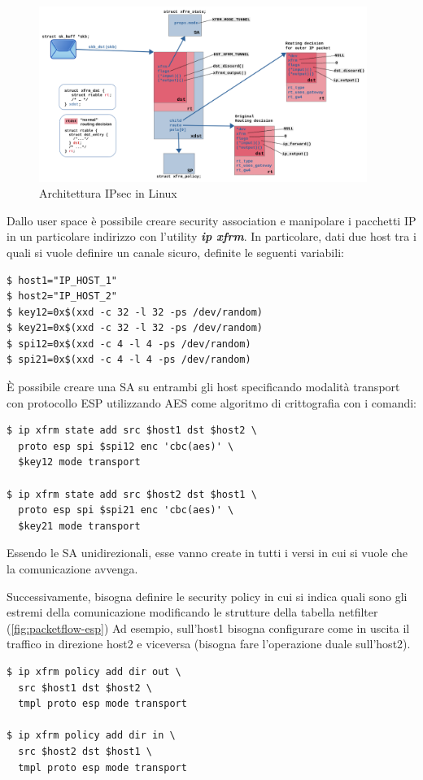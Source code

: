 \documentclass{article}
\begin{document}
\begin{figure}
  \begin{center}
    \includegraphics[width=0.95\textwidth]{figures/ipsec-linux.png}
  \end{center}
  \caption{Architettura IPsec in Linux}\label{fig:ipsec-linux}
\end{figure}


Dallo user space 
è possibile creare security association e manipolare i pacchetti IP in un particolare 
indirizzo con l'utility \textbf{\textit{ip xfrm}}. In particolare, dati due host 
tra i quali si vuole definire un canale sicuro, definite le 
seguenti variabili:

\begin{verbatim}
$ host1="IP_HOST_1"
$ host2="IP_HOST_2"
$ key12=0x$(xxd -c 32 -l 32 -ps /dev/random)
$ key21=0x$(xxd -c 32 -l 32 -ps /dev/random)
$ spi12=0x$(xxd -c 4 -l 4 -ps /dev/random)
$ spi21=0x$(xxd -c 4 -l 4 -ps /dev/random)
\end{verbatim}

È possibile creare una SA su entrambi gli host specificando modalità transport con protocollo 
ESP utilizzando AES come algoritmo di crittografia con i comandi:

\begin{verbatim}
$ ip xfrm state add src $host1 dst $host2 \ 
  proto esp spi $spi12 enc 'cbc(aes)' \  
  $key12 mode transport

$ ip xfrm state add src $host2 dst $host1 \ 
  proto esp spi $spi21 enc 'cbc(aes)' \ 
  $key21 mode transport
\end{verbatim}

Essendo le SA unidirezionali, esse vanno create in tutti i versi in cui si vuole che la 
comunicazione avvenga.

Successivamente, bisogna definire le security policy in cui si indica quali sono 
gli estremi della comunicazione modificando le strutture della tabella netfilter
(\cref{fig:packetflow-esp})
Ad esempio, sull'host1 bisogna configurare come in uscita il traffico in direzione 
host2 e viceversa (bisogna fare l'operazione duale sull'host2).
\begin{verbatim}
$ ip xfrm policy add dir out \
  src $host1 dst $host2 \ 
  tmpl proto esp mode transport

$ ip xfrm policy add dir in \ 
  src $host2 dst $host1 \ 
  tmpl proto esp mode transport
\end{verbatim}
\end{document}
